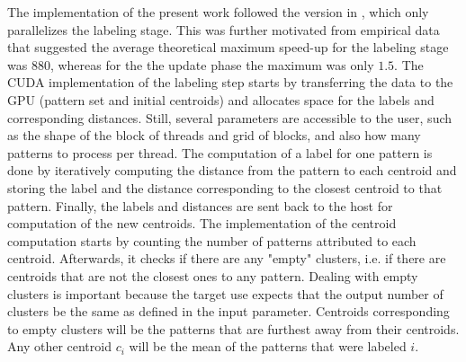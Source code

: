 The implementation of the present work followed the version in \cite{Zechner2009b}, which only parallelizes the labeling stage. %
This was further motivated from empirical data that suggested the average theoretical maximum speed-up for the labeling stage was $880$, whereas for the the update phase the maximum was only $1.5$.
The CUDA implementation of the labeling step starts by transferring the data to the GPU (pattern set and initial centroids) and allocates space for the labels and corresponding distances.
Still, several parameters are accessible to the user, such as the shape of the block of threads and grid of blocks,
and also how many patterns to process per thread.
The computation of a label for one pattern is done by iteratively computing the distance from the pattern to each centroid and storing the label and the distance corresponding to the closest centroid to that pattern.
Finally, the labels and distances are sent back to the host for computation of the new centroids.
The implementation of the centroid computation starts by counting the number of patterns attributed to each centroid.
Afterwards, it checks if there are any "empty" clusters, i.e. if there are centroids that are not the closest ones to any pattern.
Dealing with empty clusters is important because the target use expects that the output number of clusters be the same as defined in the input parameter.
Centroids corresponding to empty clusters will be the patterns that are furthest away from their centroids.
Any other centroid $c_i$ will be the mean of the patterns that were labeled $i$.